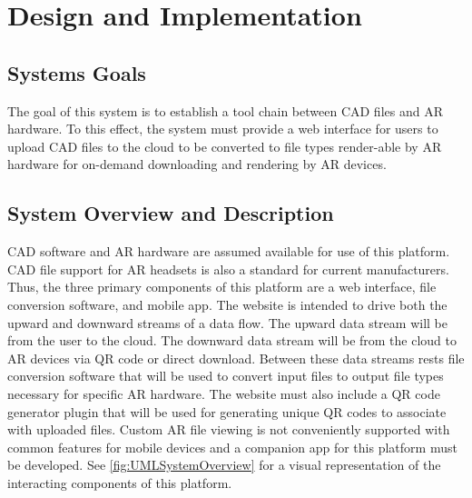 
\chapter{Design  and Implementation}

\section{Systems Goals}
The goal of this system is to establish a tool chain between CAD files and AR hardware. To this effect, the system must provide a web interface for users to upload CAD files to the cloud to be converted to file types render-able by AR hardware for on-demand downloading and rendering by AR devices.  

\section{System Overview and Description}
CAD software and AR hardware are assumed available for use of this platform. CAD file support for AR headsets is also a standard for current manufacturers. Thus, the three primary components of this platform are a web interface, file conversion software, and mobile app. The website is intended to drive both the upward and downward streams of a data flow. The upward data stream will be from the user to the cloud. The downward data stream will be from the cloud to AR devices via QR code or direct download. Between these data streams rests file conversion software that will be used to convert input files to output file types necessary for specific AR hardware. The website must also include a QR code generator plugin that will be used for generating unique QR codes to associate with uploaded files. Custom AR file viewing is not conveniently supported with common features for mobile devices and a companion app for this platform must be developed. See \ref{fig:UMLSystemOverview} for a visual representation of the interacting components of this platform.

